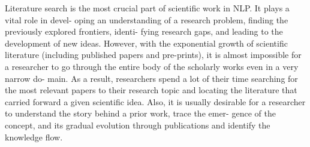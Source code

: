 Literature search is the most crucial part of scientific work in NLP. It plays a vital role in devel- oping an understanding of a research problem, finding the previously explored frontiers, identi- fying research gaps, and leading to the development of new ideas. However, with the exponential growth of scientific literature (including published papers and pre-prints), it is almost impossible for a researcher to go through the entire body of the scholarly works even in a very narrow do- main. As a result, researchers spend a lot of their time searching for the most relevant papers to their research topic and locating the literature that carried forward a given scientific idea. Also, it is usually desirable for a researcher to understand the story behind a prior work, trace the emer- gence of the concept, and its gradual evolution through publications and identify the knowledge flow.
